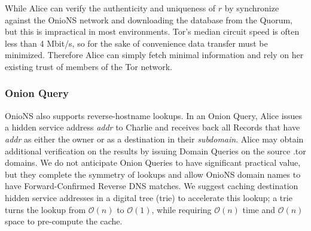 \documentclass[USenglish,oneside,twocolumn]{article}
\begin{document}
While Alice can verify the authenticity and uniqueness of $ r $ by synchronize against the OnioNS network and downloading the database from the Quorum, but this is impractical in most environments. Tor's median circuit speed is often less than 4 Mbit/s, \cite{TorMetrics} so for the sake of convenience data transfer must be minimized. Therefore Alice can simply fetch minimal information and rely on her existing trust of members of the Tor network.

\subsubsection{Onion Query}

OnioNS also supports reverse-hostname lookups. In an Onion Query, Alice issues a hidden service address \emph{addr} to Charlie and receives back all Records that have \emph{addr} as either the owner or as a destination in their \emph{subdomain}. Alice may obtain additional verification on the results by issuing Domain Queries on the source .tor domains. We do not anticipate Onion Queries to have significant practical value, but they complete the symmetry of lookups and allow OnioNS domain names to have Forward-Confirmed Reverse DNS matches. We suggest caching destination hidden service addresses in a digital tree (trie) to accelerate this lookup; a trie turns the lookup from $ \mathcal{O}(n) $ to $ \mathcal{O}(1) $, while requiring $ \mathcal{O}(n) $ time and $ \mathcal{O}(n) $ space to pre-compute the cache.



\end{document}
